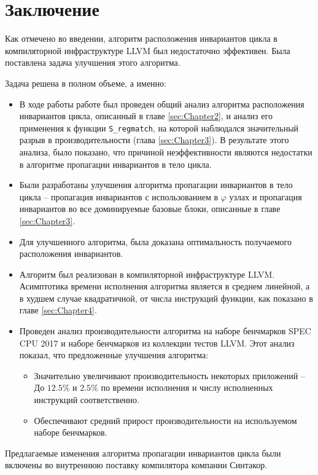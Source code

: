 \chapter*{Заключение}

Как отмечено во введении, алгоритм расположения инвариантов цикла в компиляторной инфраструктуре LLVM был недостаточно эффективен.
Была поставлена задача улучшения этого алгоритма.

Задача решена в полном объеме, а именно:
\begin{itemize}
    \item В ходе работы работе был проведен общий анализ алгоритма расположения инвариантов цикла, описанный в главе \ref{sec:Chapter2}, и анализ его применения к функции \texttt{S\_regmatch}, на которой наблюдался значительный разрыв в производительности (глава \ref{sec:Chapter3}). В результате этого анализа, было показано, что причиной неэффективности являются недостатки в алгоритме пропагации инвариантов в тело цикла.
    \item Были разработаны улучшения алгоритма пропагации инвариантов в тело цикла -- пропагация инвариантов с использованием в $\varphi$ узлах и пропагация инвариантов во все доминируемые базовые блоки, описанные в главе \ref{sec:Chapter3}.
    \item Для улучшенного алгоритма, была доказана оптимальность получаемого расположения инвариантов.
    \item Алгоритм был реализован в компиляторной инфраструктуре LLVM.
        Асимптотика времени исполнения алгоритма является в среднем линейной, а в худшем случае квадратичной, от числа инструкций функции, как показано в главе \ref{sec:Chapter4}.
    \item Проведен анализ производительности алгоритма на наборе бенчмарков SPEC CPU\textsuperscript{\tiny\textregistered} 2017 и наборе бенчмарков из коллекции тестов LLVM.
        Этот анализ показал, что предложенные улучшения алгоритма:
        \begin{itemize}
            \item Значительно увеличивают производительность некоторых приложений --
                До $12.5\%$ и $2.5\%$ по времени исполнения и числу исполненных инструкций соответственно.
            \item Обеспечивают средний прирост производительности на используемом наборе бенчмарков.
        \end{itemize}
\end{itemize}

Предлагаемые изменения алгоритма пропагации инвариантов цикла были включены во внутреннюю поставку компилятора компании Синтакор.

\newpage
